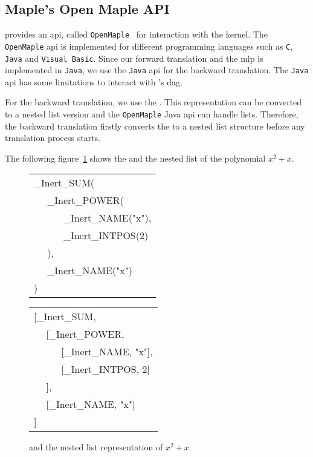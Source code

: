 \subsection{Maple's Open Maple API}
\Maple{} provides an \gls{api}, called \texttt{OpenMaple}~\parencite[\S 14.3]{MAPLE:ProgrammingGuide} for interaction with the \Maple{} kernel. The \texttt{OpenMaple} \gls{api} is implemented for different programming languages such as \texttt{C}, \texttt{Java} and \texttt{Visual Basic}. Since our forward translation and the \gls{mlp} is implemented in \texttt{Java}, we use the \texttt{Java} \gls{api} for the backward translation. The \texttt{Java} \gls{api} has some limitations to interact with \Maple's \gls{dag}.

For the backward translation, we use the \inertF. This representation can be converted to a nested list version and the \texttt{OpenMaple} Java \gls{api} can handle lists. Therefore, the backward translation firstly converts the \inertF{} to a nested list structure before any translation process starts.

The following figure~\ref{fig:inertform-list} shows the \inertF{} and the nested list of the polynomial $x^2+x$.

\begin{figure}[ht]
\centering
\begin{minipage}{.45\linewidth}
\centering
\begin{tabular}{lll}
\multicolumn{3}{l}{\_Inert\_SUM(}\\
& \multicolumn{2}{l}{\_Inert\_POWER(}\\
& & \_Inert\_NAME("x"),\\
& & \_Inert\_INTPOS(2)\\
& ),\\ 
& \multicolumn{2}{l}{\_Inert\_NAME("x")}\\
)
\end{tabular}
\end{minipage}
\begin{minipage}{.45\linewidth}
\centering
\begin{tabular}{lll}
\multicolumn{3}{l}{[\_Inert\_SUM,}\\
& \multicolumn{2}{l}{[\_Inert\_POWER, }\\
& & [\_Inert\_NAME, "x"],\\
& & [\_Inert\_INTPOS, 2]\\
& ],\\ 
& \multicolumn{2}{l}{[\_Inert\_NAME, "x"]}\\
]
\end{tabular}
\end{minipage}
\caption{\inertF{} and the nested list representation of $x^2+x$.}
\label{fig:inertform-list}
\end{figure}


